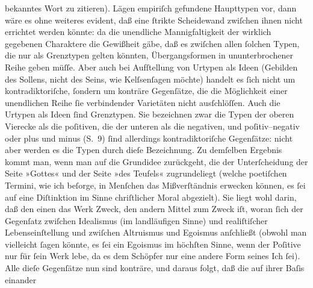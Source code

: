\begin{ledgroupsized}[t]{13cm}
               bekanntes Wort zu zitieren). Lägen empiriſch gefundene Haupttypen vor, dann wäre es
               ohne weiteres evident, daß eine ſtrikte Scheidewand zwiſchen ihnen nicht errichtet
               werden könnte: da die unendliche Mannigfaltigkeit der wirklich gegebenen Charaktere
               die Gewißheit gäbe, daß es zwiſchen allen ſolchen Typen, die nur als Grenztypen
               gelten {\pb}könnten, Übergangsformen in
               ununterbrochener Reihe geben müſſe. Aber auch bei Aufſtellung von Urtypen als Ideen
               (Gebilden des Sollens, nicht des Seins, wie Kelſsenſagen möchte) handelt es ſich nicht um
               kontradiktoriſche, ſondern um konträre Gegenſätze, die die Möglichkeit einer
               unendlichen Reihe ſie verbindender Varietäten nicht ausſchlöſſen. Auch die Urtypen
               als Ideen ſind Grenztypen.\pend
           \pstart
           Sie bezeichnen zwar die Typen der oberen Vierecke als die poſitiven, die der unteren
               als die negativen, und poſitiv–negativ oder plus und
               minus (S. 9) ſind allerdings
               kontradiktoriſche Gegenſätze: nicht aber werden es die Typen durch dieſe
               Bezeichnung.\pend
           \pstart
           Zu demſelben Ergebnis kommt {\pb}man, wenn man
               auf die Grundidee zurückgeht, die der Unterſcheidung der Seite »Gottes« und der Seite
               »des Teufels« zugrundeliegt (welche poetiſchen Termini, wie ich beſorge, in Menſchen
               das Mißverſtändnis erwecken können, es ſei auf eine Diſtinktion im Sinne chriſtlicher
               Moral abgezielt). Sie liegt wohl darin, daß den einen das Werk Zweck, den andern
               Mittel zum Zweck iſt, woran ſich der Gegenſatz zwiſchen Idealismus (im landläufigen
               Sinne) und realiſtiſcher Lebenseinſtellung und zwiſchen Altruismus und Egoismus
               anſchließt (obwohl man vielleicht ſagen könnte, es ſei ein Egoismus im höchſten
               Sinne, wenn der Poſitive nur für ſein Werk lebe, da es dem Schöpfer nur eine andere
               Form seines Ich ſei). {\pb}Alle dieſe
               Gegenſätze nun sind konträre, und daraus folgt, daß die auf ihrer Baſis einander

\end{ledgroupsized}
